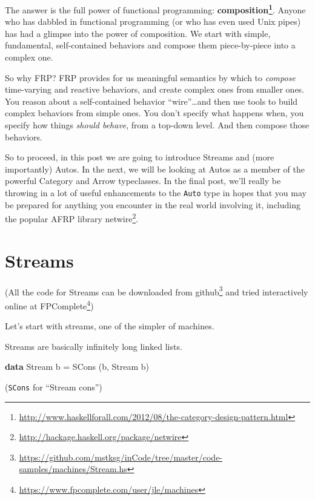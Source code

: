 \documentclass[]{article}
\newenvironment{Shaded}{}{}
\newcommand{\KeywordTok}[1]{\textcolor[rgb]{0.00,0.44,0.13}{\textbf{{#1}}}}
\newcommand{\DataTypeTok}[1]{\textcolor[rgb]{0.56,0.13,0.00}{{#1}}}
\newcommand{\FunctionTok}[1]{\textcolor[rgb]{0.02,0.16,0.49}{{#1}}}
\newcommand{\NormalTok}[1]{{#1}}
\renewcommand{\href}[2]{#2\footnote{\url{#1}}}
\begin{document}
The answer is the full power of functional programming:
\textbf{\href{http://www.haskellforall.com/2012/08/the-category-design-pattern.html}{composition}}.
Anyone who has dabbled in functional programming (or who has even used
Unix pipes) has had a glimpse into the power of composition. We start
with simple, fundamental, self-contained behaviors and compose them
piece-by-piece into a complex one.

So why FRP? FRP provides for us meaningful semantics by which to
\emph{compose} time-varying and reactive behaviors, and create complex
ones from smaller ones. You reason about a self-contained behavior
``wire''\ldots{}and then use tools to build complex behaviors from
simple ones. You don't specify what happens when, you specify how things
\emph{should behave}, from a top-down level. And then compose those
behaviors.

So to proceed, in this post we are going to introduce Streams and (more
importantly) Autos. In the next, we will be looking at Autos as a member
of the powerful Category and Arrow typeclasses. In the final post, we'll
really be throwing in a lot of useful enhancements to the \texttt{Auto}
type in hopes that you may be prepared for anything you encounter in the
real world involving it, including the popular AFRP library
\href{http://hackage.haskell.org/package/netwire}{netwire}.

\section{Streams}\label{streams}

(All the code for Streams can be downloaded
\href{https://github.com/mstksg/inCode/tree/master/code-samples/machines/Stream.hs}{from
github} and tried interactively online
\href{https://www.fpcomplete.com/user/jle/machines}{at FPComplete})

Let's start with streams, one of the simpler of machines.

Streams are basically infinitely long linked lists.

\begin{Shaded}
\begin{Highlighting}[]
\KeywordTok{data} \DataTypeTok{Stream} \NormalTok{b }\FunctionTok{=} \DataTypeTok{SCons} \NormalTok{(b, }\DataTypeTok{Stream} \NormalTok{b)}
\end{Highlighting}
\end{Shaded}

(\texttt{SCons} for ``Stream cons'')
\end{document}
